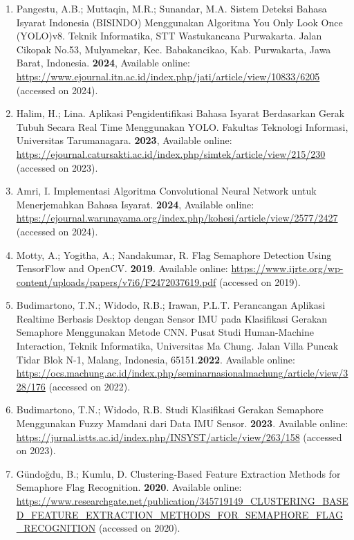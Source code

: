 \documentclass[12pt,a4paper]{article}
\begin{document}
\begin{thebibliography}{99}
\begin{enumerate}
    \item Pangestu, A.B.; Muttaqin, M.R.; Sunandar, M.A. Sistem Deteksi Bahasa Isyarat Indonesia (BISINDO) Menggunakan Algoritma You Only Look Once (YOLO)v8. Teknik Informatika, STT Wastukancana Purwakarta. Jalan Cikopak No.53, Mulyamekar, Kec. Babakancikao, Kab. Purwakarta, Jawa Barat, Indonesia. \textbf{2024},   
    Available online: \url{https://www.ejournal.itn.ac.id/index.php/jati/article/view/10833/6205} (accessed on 2024).

    \item Halim, H.; Lina. Aplikasi Pengidentifikasi Bahasa Isyarat Berdasarkan Gerak Tubuh Secara Real Time Menggunakan YOLO. Fakultas Teknologi Informasi, Universitas Tarumanagara. \textbf{2023},
    Available online: \url{https://ejournal.catursakti.ac.id/index.php/simtek/article/view/215/230 } (accessed on 2023).
    
    \item Amri, I. Implementasi Algoritma Convolutional Neural Network untuk Menerjemahkan Bahasa Isyarat. \textbf{2024}, 
    Available online: \url{https://ejournal.warunayama.org/index.php/kohesi/article/view/2577/2427} (accessed on 2024).
    
    \item Motty, A.; Yogitha, A.; Nandakumar, R. Flag Semaphore Detection Using TensorFlow and OpenCV. \textbf{2019}.  
    Available online: \url{https://www.ijrte.org/wp-content/uploads/papers/v7i6/F2472037619.pdf} (accessed on 2019).
    
    \item Budimartono, T.N.; Widodo, R.B.; Irawan, P.L.T. Perancangan Aplikasi Realtime Berbasis Desktop dengan Sensor IMU pada Klasifikasi Gerakan Semaphore Menggunakan Metode CNN. Pusat Studi Human-Machine Interaction, Teknik Informatika, Universitas Ma Chung. Jalan Villa Puncak Tidar Blok N-1, Malang, Indonesia, 65151.\textbf{2022}.  
    Available online: \url{https://ocs.machung.ac.id/index.php/seminarnasionalmachung/article/view/328/176} (accessed on 2022).
    
    \item Budimartono, T.N.; Widodo, R.B. Studi Klasifikasi Gerakan Semaphore Menggunakan Fuzzy Mamdani dari Data IMU Sensor. \textbf{2023}.  
    Available online: \url{https://jurnal.istts.ac.id/index.php/INSYST/article/view/263/158} (accessed on 2023).
    
    \item Gündoğdu, B.; Kumlu, D. Clustering-Based Feature Extraction Methods for Semaphore Flag Recognition. \textbf{2020}.  
    Available online: \url{https://www.researchgate.net/publication/345719149_CLUSTERING_BASED_FEATURE_EXTRACTION_METHODS_FOR_SEMAPHORE_FLAG_RECOGNITION} (accessed on 2020).
    
\end{enumerate}
\end{thebibliography}
\end{document}
